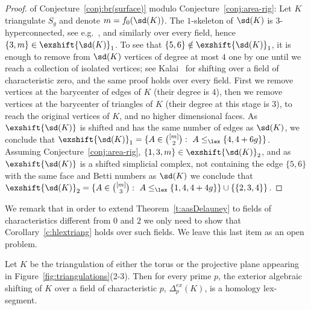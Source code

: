 \begin{proof} of Conjecture~\ref{conj:br(surface)} modulo 
Conjecture~\ref{conj:area-rig}: 
Let $K$ triangulate $S_g$ and denote $m=f_0(\sd(K))$.
The $1$-skeleton of $\sd(K)$ is $3$-hyperconnected, see e.g.~\cite[Thm.3.4.2]{nevo07-thesis}, and similarly over every field, hence $\{3,m\}\in \exshift{\sd(K)}_1$. To see that $\{5,6\}\notin \exshift{\sd(K)}_1$, it is enough to remove from $\sd(K)$ vertices of degree at most $4$ one by one until we reach a collection of isolated vertices; see Kalai~\cite[Lem.4.3(i)]{kalai85-hyperconnectivity} for shifting over a field of characteristic zero, and the same proof holds over every field. First we remove vertices at the barycenter of edges of $K$ (their degree is $4$), then we remove vertices at the barycenter of triangles of $K$ (their degree at this stage is $3$), to reach the original vertices of $K$, and no higher dimensional faces. As 
$\exshift{\sd(K)}$ is shifted and has the same number of edges as $\sd(K)$, we conclude that $\exshift{\sd(K)}_1=\{A\in \binom{[m]}{2}:\ A\le_{\lex} \{4,4+6g\} \}$.
Assuming Conjecture~\ref{conj:area-rig}, $\{1,3,m\}\in \exshift{\sd(K)}_2$, and as $\exshift{\sd(K)}$ is a shifted simplicial complex, not containing the edge $\{5,6\}$ with the same face and Betti numbers as $\sd(K)$ we conclude that $\exshift{\sd(K)}_2=\{A\in \binom{[m]}{3}:\ A\le_{\lex} \{1,4,4+4g\}\}\cup\{\{2,3,4\}\}$.
\end{proof}
%
We remark that in order to extend Theorem~\ref{t:aasDelauney} to fields of characteristics different from $0$ and $2$ we only need to show that Corollary~\ref{c:hlextriang} holds over such fields. We leave this last item as an open problem.
\begin{problem}
    Let $K$ be the triangulation of either the torus or the projective plane appearing in Figure~\ref{fig:triangulations}(2-3). Then for every prime $p$, the exterior algebraic shifting of $K$ over a field of characteristic $p$, $\Delta^{ex}_p(K)$, is a homology lex-segment.
\end{problem}
%
%
\appendix
